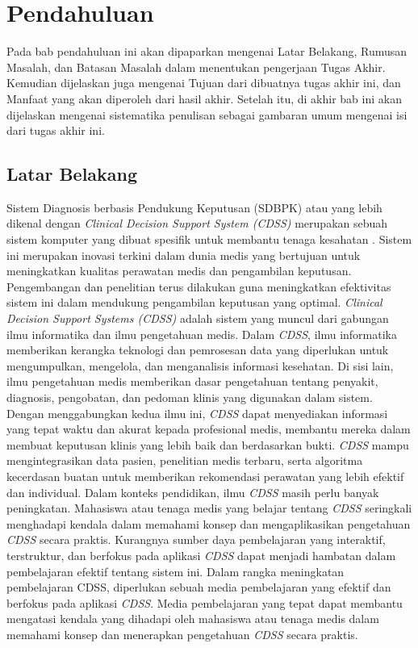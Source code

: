 \chapter{Pendahuluan}
Pada bab pendahuluan ini akan dipaparkan mengenai Latar Belakang, Rumusan Masalah, dan Batasan Masalah dalam menentukan pengerjaan Tugas Akhir.
Kemudian dijelaskan juga mengenai Tujuan dari dibuatnya tugas akhir ini, dan Manfaat yang akan diperoleh dari hasil akhir.
Setelah itu, di akhir bab ini akan dijelaskan mengenai sistematika penulisan sebagai gambaran umum mengenai isi dari tugas akhir ini.

\section{Latar Belakang}
Sistem Diagnosis berbasis Pendukung Keputusan (SDBPK) atau yang lebih dikenal dengan \textit{Clinical Decision Support System (CDSS)}
merupakan sebuah sistem komputer yang dibuat spesifik untuk membantu tenaga kesahatan \cite{sutton2020overview}.
Sistem ini merupakan inovasi terkini dalam dunia medis yang bertujuan untuk meningkatkan kualitas perawatan medis dan pengambilan keputusan.
Pengembangan dan penelitian terus dilakukan guna meningkatkan efektivitas sistem ini dalam mendukung pengambilan keputusan yang optimal.
\textit{Clinical Decision Support Systems (CDSS)} adalah sistem yang muncul dari gabungan ilmu informatika dan ilmu pengetahuan medis.
Dalam \textit{CDSS}, ilmu informatika memberikan kerangka teknologi dan pemrosesan data yang diperlukan untuk mengumpulkan, mengelola, dan menganalisis informasi kesehatan.
Di sisi lain, ilmu pengetahuan medis memberikan dasar pengetahuan tentang penyakit, diagnosis, pengobatan, dan pedoman klinis yang digunakan dalam sistem. 
Dengan menggabungkan kedua ilmu ini, \textit{CDSS} dapat menyediakan informasi yang tepat waktu dan akurat kepada profesional medis, membantu mereka dalam membuat keputusan klinis yang lebih baik dan berdasarkan bukti\cite{sutton2020overview}.
\textit{CDSS} mampu mengintegrasikan data pasien, penelitian medis terbaru, serta algoritma kecerdasan buatan untuk memberikan rekomendasi perawatan yang lebih efektif dan individual.
Dalam konteks pendidikan, ilmu \textit{CDSS} masih perlu banyak peningkatan.
Mahasiswa atau tenaga medis yang belajar tentang \textit{CDSS} seringkali menghadapi kendala dalam memahami konsep dan mengaplikasikan pengetahuan \textit{CDSS} secara praktis.
Kurangnya sumber daya pembelajaran yang interaktif, terstruktur, dan berfokus pada aplikasi \textit{CDSS} dapat menjadi hambatan dalam pembelajaran efektif tentang sistem ini.
Dalam rangka meningkatan pembelajaran CDSS, diperlukan sebuah media pembelajaran yang efektif dan berfokus pada aplikasi \textit{CDSS}.
Media pembelajaran yang tepat dapat membantu mengatasi kendala yang dihadapi oleh mahasiswa atau tenaga medis dalam memahami konsep dan menerapkan pengetahuan \textit{CDSS} secara praktis.

